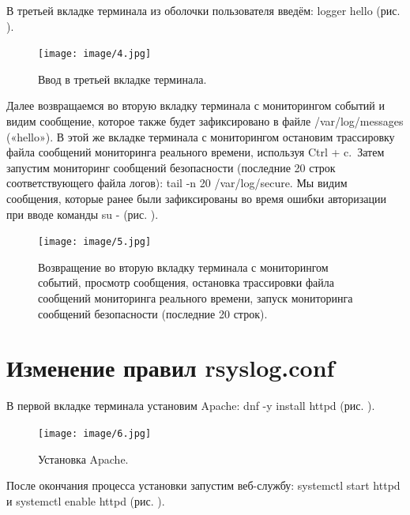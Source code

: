 \documentclass[
  english,
  russian,
  12pt,
  a4paper,
  DIV=11,
  numbers=noendperiod]{scrreprt}
\begin{document}
В третьей вкладке терминала из оболочки пользователя введём: logger
hello (рис. \autocite*{fig:004}).

\begin{figure}

{\centering \texttt{[image: image/4.jpg]}

}

\caption{Ввод в третьей вкладке терминала.}

\end{figure}%

Далее возвращаемся во вторую вкладку терминала с мониторингом событий и
видим сообщение, которое также будет зафиксировано в файле
/var/log/messages («hello»). В этой же вкладке терминала с мониторингом
остановим трассировку файла сообщений мониторинга реального времени,
используя Ctrl + c.~Затем запустим мониторинг сообщений безопасности
(последние 20 строк соответствующего файла логов): tail -n 20
/var/log/secure. Мы видим сообщения, которые ранее были зафиксированы во
время ошибки авторизации при вводе команды su - (рис.
\autocite*{fig:005}).

\begin{figure}

{\centering \texttt{[image: image/5.jpg]}

}

\caption{Возвращение во вторую вкладку терминала с мониторингом событий,
просмотр сообщения, остановка трассировки файла сообщений мониторинга
реального времени, запуск мониторинга сообщений безопасности (последние
20 строк).}

\end{figure}%

\section{Изменение правил
rsyslog.conf}\label{ux438ux437ux43cux435ux43dux435ux43dux438ux435-ux43fux440ux430ux432ux438ux43b-rsyslog.conf}

В первой вкладке терминала установим Apache: dnf -y install httpd (рис.
\autocite*{fig:006}).

\begin{figure}

{\centering \texttt{[image: image/6.jpg]}

}

\caption{Установка Apache.}

\end{figure}%

После окончания процесса установки запустим веб-службу: systemctl start
httpd и systemctl enable httpd (рис. \autocite*{fig:007}).
\end{document}
